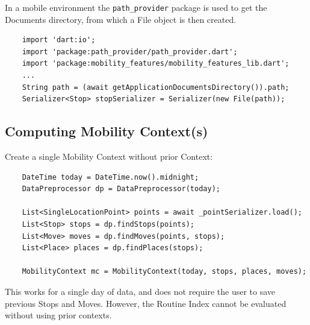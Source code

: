 In a mobile environment the \verb|path_provider| package is used to get the Documents directory, from which a File object is then created.

\begin{verbatim}
    import 'dart:io';
    import 'package:path_provider/path_provider.dart';
    import 'package:mobility_features/mobility_features_lib.dart';
    ...
    String path = (await getApplicationDocumentsDirectory()).path;
    Serializer<Stop> stopSerializer = Serializer(new File(path));
\end{verbatim}

\subsection{Computing Mobility Context(s)}
Create a single Mobility Context without prior Context:

\begin{verbatim}
    DateTime today = DateTime.now().midnight;
    DataPreprocessor dp = DataPreprocessor(today);

    List<SingleLocationPoint> points = await _pointSerializer.load();
    List<Stop> stops = dp.findStops(points);
    List<Move> moves = dp.findMoves(points, stops);
    List<Place> places = dp.findPlaces(stops);
    
    MobilityContext mc = MobilityContext(today, stops, places, moves);
\end{verbatim}

This works for a single day of data, and does not require the user to save previous Stops and Moves. However, the Routine Index cannot be evaluated without using prior contexts. 


    
    
